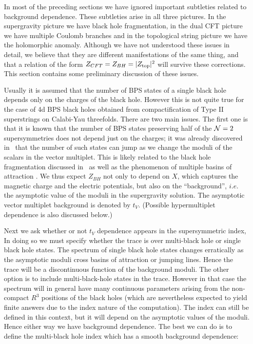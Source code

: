 

In most of the preceding sections we have ignored important
subtleties related to background dependence. These subtleties
arise in all three pictures. In the supergravity picture we have
black hole fragmentation, in the dual CFT picture we have multiple
Coulomb branches and in the topological string picture we have the
holomorphic anomaly. Although we have not understood these issues
in detail, we believe that they are different manifestations of
the same thing, and that a relation of the form
$Z_{CFT}=Z_{BH}=|Z_{\rm top}|^2$ will survive these corrections. This
section contains some preliminary discussion of these issues.


 Usually it is assumed
that the number of BPS states of a single black hole depends only
on the charges of the black hole. However this is not quite true
for the case of 4d BPS black holes obtained from compactification
of Type II superstrings on Calabi-Yau threefolds. There are two
main issues. The first one is that it is known that the number of
BPS states preserving half of the ${\cal N}=2$ supersymmetries
does not depend just on the charges; it was already discovered in
\sw\ that the number of such states can jump as we change the
moduli of the scalars in the vector multiplet. This is likely
related to the black hole fragmentation discussed in \mms\ as well
as the phenomenon of multiple basins of attraction 
. We
thus expect $Z_{BH}$ not only to depend on $X$, which captures
the magnetic charge and the electric potentials, but also on the
``background'', $i.e.$ the asymptotic value of the moduli in the
supergravity solution. The asymptotic vector multiplet background
is denoted by $t_V$. (Possible hypermultiplet dependence is also
discussed below.)

Next we ask whether or not $t_V$ dependence appears in the
supersymmetric index, \eqn{} In doing so we
must specify whether the trace is over multi-black hole or single
black hole states. The spectrum of single black hole states
changes erratically as the asymptotic moduli cross basins of
attraction or jumping lines. Hence the trace will be a
discontinuous function of the background moduli. The other option
is to include multi-black-hole states in the trace. However in
that case the spectrum will in general have many continuous
parameters arising from the non-compact $R^3$ positions of the
black holes (which are nevertheless expected to yield finite
answers due to the index nature of the computation).
The index can still be defined in this context, but
it will depend on the asymptotic values of the moduli. Hence
either way we have background dependence. The best we can do is to
define the multi-black hole index which has a smooth background
dependence: \eqn{}

